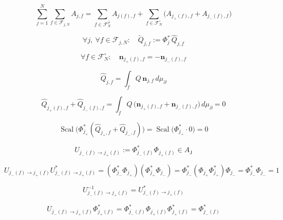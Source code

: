 \documentclass[12pt]{article}
\begin{document}
\begin{equation}
\sum_{j=1}^N\sum_{f\in\mathcal{F}_{j,N}}A_{j,f}
=\sum_{f\in\mathcal{F}_N^\partial}A_{j(f),f}
+\sum_{f\in\mathcal{F}_N^\circ}\Big(A_{j_+(f),f}+A_{j_-(f),f}\Big)
\end{equation}

\begin{equation}
\forall j,\ \forall f\in\mathcal{F}_{j,N}:\quad \widetilde{Q}_{j,f}:=\Phi_j^*\,\widehat{Q}_{j,f}
\end{equation}

\begin{equation}
\forall f\in\mathcal{F}_N^\circ:\quad
\mathbf{n}_{j_+(f),f}=-\mathbf{n}_{j_-(f),f}
\end{equation}

\begin{equation}
\widehat{Q}_{j,f}=\int_f Q\,\mathbf{n}_{j,f}\,d\mu_{\partial}
\end{equation}

\begin{equation}
\widehat{Q}_{j_+(f),f}+\widehat{Q}_{j_-(f),f}
=\int_f Q\,\bigl(\mathbf{n}_{j_+(f),f}+\mathbf{n}_{j_-(f),f}\bigr)\,d\mu_{\partial}=0
\end{equation}

\begin{equation}
\operatorname{Scal}\!\bigl(\Phi_{j_+}^*(\widehat{Q}_{j_+,f}+\widehat{Q}_{j_-,f})\bigr)
=\operatorname{Scal}\!\bigl(\Phi_{j_+}^*\cdot 0\bigr)=0
\end{equation}

\begin{equation}
U_{j_-(f)\to j_+(f)}:=\Phi_{j_-(f)}^{*}\Phi_{j_+(f)}\in A_{\mathsf{J}}
\end{equation}

\begin{equation}
U_{j_-(f)\to j_+(f)}U_{j_-(f)\to j_+(f)}^{*}
=(\Phi_{j_-}^{*}\Phi_{j_+})(\Phi_{j_+}^{*}\Phi_{j_-})
=\Phi_{j_-}^{*}(\Phi_{j_+}\Phi_{j_+}^{*})\Phi_{j_-}
=\Phi_{j_-}^{*}\Phi_{j_-}
=1
\end{equation}

\begin{equation}
U_{j_-(f)\to j_+(f)}^{-1}=U_{j_-(f)\to j_+(f)}^{*}
\end{equation}

\begin{equation}
U_{j_-(f)\to j_+(f)}\Phi_{j_+(f)}^{*}
=\Phi_{j_-(f)}^{*}\Phi_{j_+(f)}\Phi_{j_+(f)}^{*}
=\Phi_{j_-(f)}^{*}
\end{equation}
\end{document}
